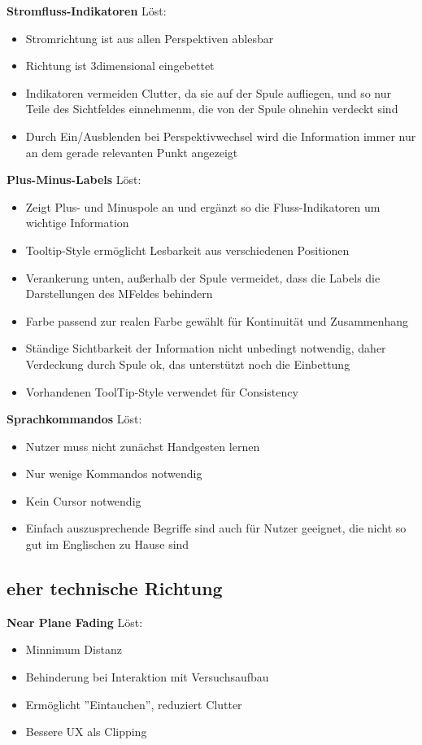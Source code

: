 \textbf{Stromfluss-Indikatoren}
Löst: 
\begin{itemize}
	\item Stromrichtung ist aus allen Perspektiven ablesbar
	\item Richtung ist 3dimensional eingebettet
	\item Indikatoren vermeiden Clutter, da sie auf der Spule aufliegen, und so nur Teile des Sichtfeldes einnehmenm, die von der Spule ohnehin verdeckt sind
	\item Durch Ein/Ausblenden bei Perspektivwechsel wird die Information immer nur an dem gerade relevanten Punkt angezeigt
\end{itemize}

\textbf{Plus-Minus-Labels}
Löst: 
\begin{itemize}
	\item Zeigt Plus- und Minuspole an und ergänzt so die Fluss-Indikatoren um wichtige Information
	\item Tooltip-Style ermöglicht Lesbarkeit aus verschiedenen Positionen
	\item Verankerung unten, außerhalb der Spule vermeidet, dass die Labels die Darstellungen des MFeldes behindern
	\item Farbe passend zur realen Farbe gewählt für Kontinuität und Zusammenhang
	\item Ständige Sichtbarkeit der Information nicht unbedingt notwendig, daher Verdeckung durch Spule ok, das unterstützt noch die Einbettung
	\item Vorhandenen ToolTip-Style verwendet für Consistency
\end{itemize}

\textbf{Sprachkommandos}
Löst: 
\begin{itemize}
	\item Nutzer muss nicht zunächst Handgesten lernen
	\item Nur wenige Kommandos notwendig
	\item Kein Cursor notwendig
	\item Einfach auszusprechende Begriffe sind auch für Nutzer geeignet, die nicht so gut im Englischen zu Hause sind
\end{itemize}

\subsection{eher technische Richtung}

\textbf{Near Plane Fading}
Löst: 
\begin{itemize}
	\item Minnimum Distanz
	\item Behinderung bei Interaktion mit Versuchsaufbau
	\item Ermöglicht ''Eintauchen'', reduziert Clutter
	\item Bessere UX als Clipping
\end{itemize}

